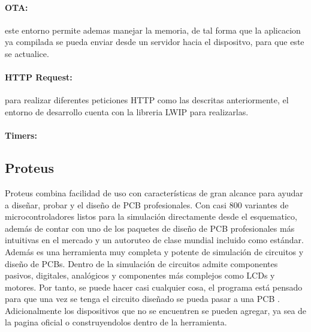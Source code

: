 
\paragraph{OTA:}este entorno permite ademas manejar la memoria, de tal forma que la aplicacion ya compilada se pueda enviar desde un servidor hacia el dispositvo, para que este se actualice.


\paragraph{HTTP Request:}para realizar diferentes peticiones HTTP como las descritas anteriormente, el entorno de desarrollo cuenta con la libreria LWIP para realizarlas.

\paragraph{Timers:}

\subsection{Proteus}

Proteus combina facilidad de uso con características de gran alcance para ayudar a diseñar, probar y el diseño de PCB profesionales. Con casi 800 variantes de microcontroladores listos para la simulación directamente desde el esquematico, además de contar con uno de los paquetes de diseño de PCB profesionales más intuitivas en el mercado y un autoruteo de clase mundial incluido como estándar. \cite{Prot1} \\

Además es una herramienta muy completa y potente de simulación de circuitos y diseño de PCBs. Dentro de la simulación de circuitos admite componentes pasivos, digitales, analógicos y componentes más complejos como LCDs y motores. Por tanto, se puede hacer casi cualquier cosa, el programa está pensado para que una vez se tenga el circuito diseñado se pueda pasar a una PCB \cite{Prot2}.
Adicionalmente los dispositivos que no se encuentren se pueden agregar, ya sea de la pagina oficial o construyendolos dentro de la herramienta.
